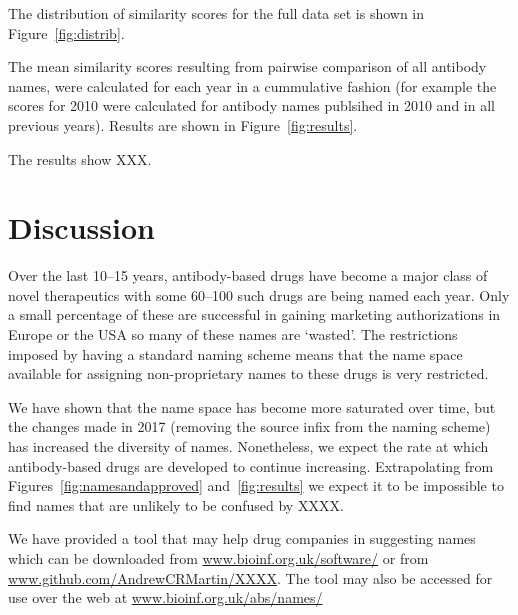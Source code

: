 \documentclass{article}
\begin{document}
The distribution of similarity scores for the full data set is shown in
Figure~\ref{fig:distrib}. 

The mean similarity scores resulting from pairwise comparison of all
antibody names, were calculated for each year in a cummulative fashion
(for example the scores for 2010 were calculated for antibody names
publsihed in 2010 and in all previous years). Results are shown in
Figure~\ref{fig:results}. 

The results show XXX.

\section{Discussion}
Over the last 10--15 years, antibody-based drugs have become a major
class of novel therapeutics with some 60--100 such drugs are being
named each year. Only a small percentage of these are successful in
gaining marketing authorizations in Europe or the USA so many of these
names are `wasted'. The restrictions imposed by having a standard
naming scheme means that the name space available for assigning
non-proprietary names to these drugs is very restricted.

We have shown that the name space has become more saturated over time,
but the changes made in 2017 (removing the source infix from the
naming scheme) has increased the diversity of names. Nonetheless, we
expect the rate at which antibody-based drugs are developed to
continue increasing. Extrapolating from
Figures~\ref{fig:namesandapproved} and~\ref{fig:results} we expect it
to be impossible to find names that are unlikely to be confused by
XXXX.

We have provided a tool that may help drug companies in suggesting
names which can be downloaded from \url{www.bioinf.org.uk/software/}
or from \url{www.github.com/AndrewCRMartin/XXXX}. The tool may also be
accessed for use over the web at \url{www.bioinf.org.uk/abs/names/}



\end{document}
